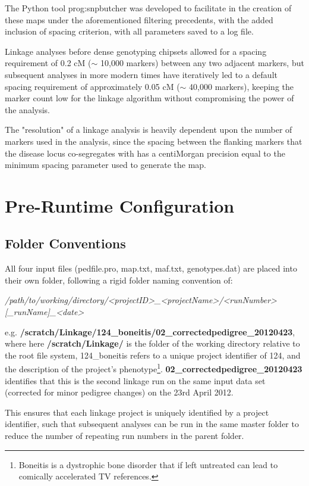 The Python tool \gls{prog:snpbutcher} was developed to facilitate in the creation of these maps under the aforementioned filtering precedents, with the added inclusion of spacing criterion, with all parameters saved to a log file. 

Linkage analyses before dense genotyping chipsets allowed for a spacing requirement of 0.2 cM ($\sim$ 10,000 markers) between any two adjacent markers, but subsequent analyses in more modern times have iteratively led to a default spacing requirement of approximately 0.05 cM ($\sim$ 40,000 markers), keeping the marker count low for the linkage algorithm without compromising the power of the analysis.

The "resolution" of a linkage analysis is heavily dependent upon the number of markers used in the analysis, since the spacing between the flanking markers that the disease locus co-segregates with has a centiMorgan precision equal to the minimum spacing parameter used to generate the map.


\section{Pre-Runtime Configuration}

\subsection{Folder Conventions}

All four input files (pedfile.pro, map.txt, maf.txt, genotypes.dat) are placed into their own folder, following a rigid folder naming convention of: 

\textit{\footnotesize /path/to/working/directory/<projectID>\_<projectName>/<runNumber>[\_runName]\_<date>}

e.g. {\bf\footnotesize /scratch/Linkage/124\_boneitis/02\_correctedpedigree\_20120423}, where here {\bf\footnotesize /scratch/Linkage/} is the folder of the working directory relative to the root file system, 124\_boneitis refers to a unique project identifier of 124, and the description of the project's phenotype\footnote{Boneitis is a dystrophic bone disorder that if left untreated can lead to comically accelerated TV references.}. {{\bf\footnotesize 02\_correctedpedigree\_20120423} identifies that this is the second linkage run on the same input data set (corrected for minor pedigree changes) on the 23rd April 2012.}

This ensures that each linkage project is uniquely identified by a project identifier, such that subsequent analyses can be run in the same master folder to reduce the number of repeating run numbers in the parent folder.

